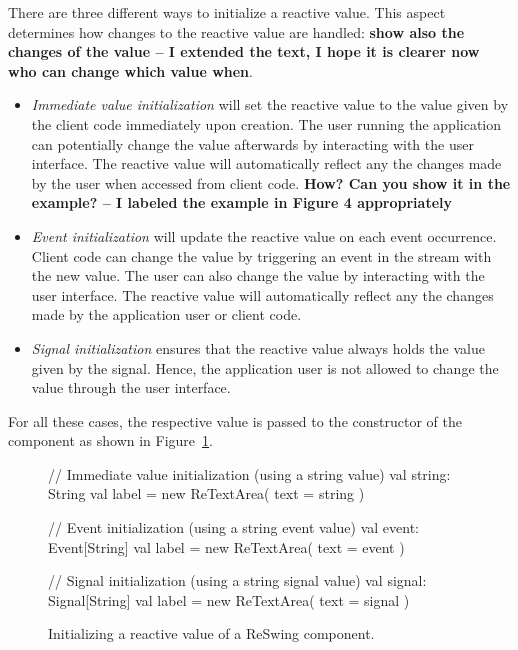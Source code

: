 \documentclass{scrartcl}
\begin{document}
There are three different ways to initialize a reactive value. This
aspect determines how changes to the reactive value are handled: {\bf
  show also the changes of the value -- I extended the text, I hope
  it is clearer now who can change which value when}.

\begin{itemize}
\item \emph{Immediate value initialization} will set the reactive
  value to the value given by the client code immediately upon
  creation. The user running the application can potentially change
  the value afterwards by interacting with the user interface.
  The reactive value will automatically reflect any the changes made
  by the user when accessed from client code.
  {\bf How? Can you show it in the example? -- I labeled the example
  in Figure 4 appropriately}
\item \emph{Event initialization} will update the reactive value on
  each event occurrence. Client code can change the value by
  triggering an event in the stream with the new value. The user can
  also change the value by interacting with the user interface.
  The reactive value will automatically reflect any the changes made
  by the application user or client code.
\item \emph{Signal initialization} ensures that the reactive value
  always holds the value given by the signal. Hence, the application
  user is not allowed to change the value through the user interface.
\end{itemize}

For all these cases, the respective value is passed to the constructor
of the component as shown in
Figure~\ref{lst:initializing-reactive-values}.

\begin{figure}[h]
\begin{codenv}
// Immediate value initialization (using a string value)
val string: String
val label = new ReTextArea(
    text = string 
)

// Event initialization (using a string event value)
val event: Event[String]
val label = new ReTextArea(
    text = event
)

// Signal initialization (using a string signal value)
val signal: Signal[String] 
val label = new ReTextArea( 
    text = signal 
)
\end{codenv}
\caption{Initializing a reactive value of a ReSwing component.}
\label{lst:initializing-reactive-values}
\end{figure}
\end{document}
